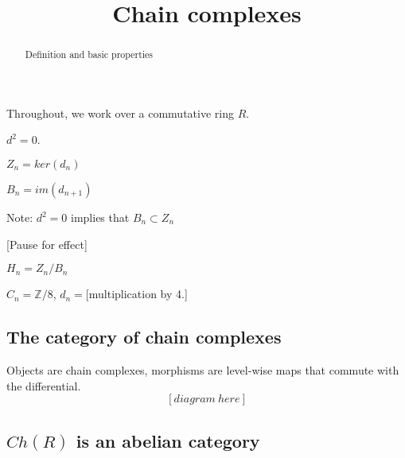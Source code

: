 \documentclass{ximera}
\title{Chain complexes}
\begin{document}
\begin{abstract}
  Definition and basic properties
\end{abstract}
\maketitle

Throughout, we work over a commutative ring $R$.

\begin{definition}
  $d^2 = 0$.
\end{definition}

\begin{definition}[Cycles]
  $Z_n = ker(d_n)$
\end{definition}

\begin{definition}[Boundaries]
  $B_n = im(d_{n+1})$
\end{definition}

Note: $d^2 = 0$ implies that $B_n \subset Z_n$

[Pause for effect]

\begin{definition}[Homology]
  $H_n = Z_n/B_n$ 
\end{definition}

\begin{example}
  $C_n = \mathbb{Z}/8$, $d_n = $[multiplication by 4.]
\end{example}

\subsection{The category of chain complexes}

Objects are chain complexes, morphisms are level-wise maps that
commute with the differential.
\[
[diagram\ here]
\]

\subsection{$Ch(R)$ is an abelian category}
\end{document}
